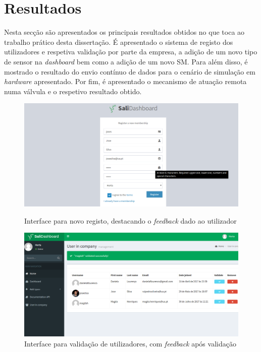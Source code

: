 \section{Resultados}

Nesta secção são apresentados os principais resultados obtidos no que toca ao trabalho prático desta dissertação. É apresentado o sistema de registo dos utilizadores e respetiva validação por parte da empresa, a adição de um novo tipo de sensor na \textit{dashboard} bem como a adição de um novo \acl{SM}. Para além disso, é mostrado o resultado do envio contínuo de dados para o cenário de simulação em \textit{hardware} apresentado. Por fim, é apresentado o mecanismo de atuação remota numa válvula e o respetivo resultado obtido. 







\newpage


\begin{figure}[h]
	\centering
	\begin{minipage}[b]{0.495\textwidth}
		\centering
		\includegraphics[width=\textwidth]{prints-web/register.png}
		\caption{Interface para novo registo, destacando o \textit{feedback} dado ao utilizador}
		\label{novouser}
	\end{minipage}
	\hfill
	\begin{minipage}[b]{0.495\textwidth}
		\centering
		\includegraphics[width=\textwidth]{prints-web/validate_company.png}
		\caption{Interface para validação de utilizadores, com \textit{feedback} após validação}
		\label{validateuser}
	\end{minipage}
\end{figure}


